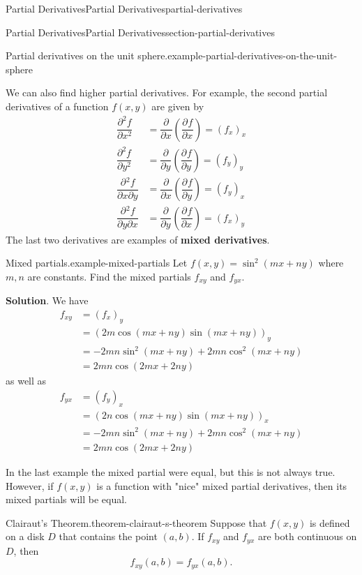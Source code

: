 \documentclass[oneside,10pt,]{book}
\newcommand{\terminology}[1]{\textbf{#1}}
\numberwithin{equation}{section}
\newcommand{\pdv}[3][]{\dfrac{\partial^{#1} #2}{\partial #3^{#1}}}
\begin{document}
\begin{chapterptx}{Partial Derivatives}{}{Partial Derivatives}{}{}{partial-derivatives}
\begin{sectionptx}{Partial Derivatives}{}{Partial Derivatives}{}{}{section-partial-derivatives}
\begin{example}{Partial derivatives on the unit sphere.}{example-partial-derivatives-on-the-unit-sphere}
\end{example}
\hypertarget{p-1363}{}%
We can also find higher partial derivatives. For example, the second partial derivatives of a function \(f(x,y)\) are given by%
\begin{align*}
\pdv[2]{f}{x} & = \pdv{}{x}\left(\pdv{f}{x}\right) = (f_{x})_{x} \\
\pdv[2]{f}{y} & = \pdv{}{y}\left(\pdv{f}{y}\right) = (f_{y})_{y} \\
\pdv{{}^{2}f}{x\partial y} & = \pdv{}{x}\left(\pdv{f}{y}\right) = (f_{y})_{x} \\
\pdv{{}^{2}f}{y\partial x} & = \pdv{}{y}\left(\pdv{f}{x}\right) = (f_{x})_{y} 
\end{align*}
The last two derivatives are examples of \terminology{mixed derivatives}.%
\begin{example}{Mixed partials.}{example-mixed-partials}%
\hypertarget{p-1364}{}%
Let \(f(x,y) = \sin^{2}(mx+ny)\) where \(m,n\) are constants. Find the mixed partials \(f_{xy}\) and \(f_{yx}\).%
\par\smallskip%
\noindent\textbf{Solution}.\hypertarget{solution-219}{}\quad%
\hypertarget{p-1365}{}%
We have%
\begin{align*}
f_{xy} & = (f_{x})_{y} \\
& = (2m\cos(mx+ny)\sin(mx+ny))_{y} \\
& = -2mn\sin^{2}(mx+ny) + 2mn\cos^{2}(mx+ny) \\
& = 2mn\cos(2mx+2ny) 
\end{align*}
as well as%
\begin{align*}
f_{yx} & = (f_{y})_{x} \\
& = (2n\cos(mx+ny)\sin(mx+ny))_{x} \\
& = -2mn\sin^{2}(mx+ny) + 2mn\cos^{2}(mx+ny) \\
& = 2mn\cos(2mx+2ny) 
\end{align*}
%
\end{example}
\hypertarget{p-1366}{}%
In the last example the mixed partial were equal, but this is not always true. However, if \(f(x,y)\) is a function with "nice" mixed partial derivatives, then its mixed partials will be equal.%
\begin{theorem}{Clairaut's Theorem.}{}{theorem-clairaut-s-theorem}%
\hypertarget{p-1367}{}%
Suppose that \(f(x,y)\) is defined on a disk \(D\) that contains the point \((a,b)\). If \(f_{xy}\) and \(f_{yx}\) are both continuous on \(D\), then%
\begin{equation*}
f_{xy}(a,b) = f_{yx}(a,b).
\end{equation*}

\end{theorem}
\end{sectionptx}
\end{chapterptx}
\end{document}
